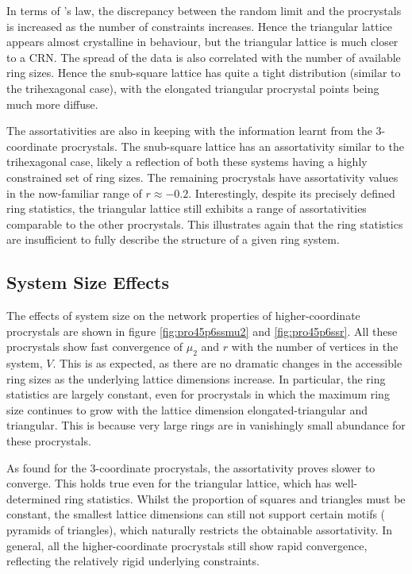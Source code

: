 In terms of \lm's law, the discrepancy between the random limit and the procrystals is increased as the number of constraints increases. 
Hence the triangular lattice appears almost crystalline in behaviour, but the triangular lattice is much closer to a CRN.
The spread of the data is also correlated with the number of available ring sizes.
Hence the snub\--square lattice has quite a tight distribution (similar to the trihexagonal case), with the elongated triangular procrystal points being much more diffuse.

The assortativities are also in keeping with the information learnt from the 3\--coordinate procrystals.
The snub\--square lattice has an assortativity similar to the trihexagonal case, likely a reflection of both these systems having a highly constrained set of ring sizes.
The remaining procrystals have assortativity values in the now\--familiar range of $r\approx-0.2$.
Interestingly, despite its precisely defined ring statistics, the triangular lattice still exhibits a range of assortativities comparable to the other procrystals.
This illustrates again that the ring statistics are insufficient to fully describe the structure of a given ring system.

\subsection{System Size Effects}

The effects of system size on the network properties of higher\--coordinate procrystals are shown in figure \ref{fig:pro45p6ssmu2} and \ref{fig:pro45p6ssr}.
All these procrystals show fast convergence of $\mu_2$ and $r$ with the number of vertices in the system, $V$.
This is as expected, as there are no dramatic changes in the accessible ring sizes as the underlying lattice dimensions increase.
In particular, the ring statistics are largely constant, even for procrystals in which the maximum ring size continues to grow with the lattice dimension \ie {}elongated\--triangular and triangular.
This is because very large rings are in vanishingly small abundance for these  procrystals.

As found for the 3\--coordinate procrystals, the assortativity proves slower to converge. 
This holds true even for the triangular lattice, which has well\--determined ring statistics.
Whilst the proportion of squares and triangles must be constant, the smallest lattice dimensions can still not support certain motifs (\eg{} pyramids of triangles), which naturally restricts the obtainable assortativity.
In general, all the higher\--coordinate procrystals still show rapid convergence, reflecting the relatively rigid underlying constraints.

